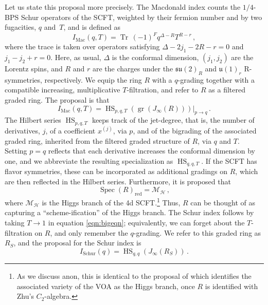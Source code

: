 \documentclass[12pt]{article}
\numberwithin{equation}{section}
\numberwithin{figure}{section}
\theoremstyle{plain}
\theoremstyle{definition}
\begin{document}
Let us state this proposal more precisely. The Macdonald index \cite{Gadde:2011uv} counts the $1/4$-BPS Schur operators of the SCFT, weighted by their fermion number and by two fugacities, $q$ and~$T$, and is defined as
\begin{equation}
    I_\text{Mac}(q, T) = \operatorname{Tr} \, (-1)^F q^{\Delta - R} T^{R - r} \,,
\end{equation}
where the trace is taken over operators satisfying $\Delta - 2j_1 - 2R - r = 0$ and $j_1 - j_2 + r = 0$. Here, as usual, $\Delta$ is the conformal dimension, $(j_1, j_2)$ are the Lorentz spins, and $R$ and $r$ are the charges under the $\mathfrak{su}(2)_R$ and $\mathfrak{u}(1)_r$ R-symmetries, respectively. We equip the ring $R$ with a $q$-grading together with a compatible increasing, multiplicative $T$-filtration, and refer to $R$ as a filtered graded ring. The proposal is that
\begin{equation}\label{eqn:bigeqn}
    I_\text{Mac}(q, T) = \operatorname{HS}_{p,q,T}(\operatorname{gr}(J_\infty(R))) \big|_{p \rightarrow q} \,.
\end{equation}
The Hilbert series $\operatorname{HS}_{p,q,T}$ keeps track of the jet-degree, that is, the number of derivatives, $j$, of a coefficient $x^{(j)}$, via $p$, and of the bigrading of the associated graded ring, inherited from the filtered graded structure of $R$, via $q$ and $T$. Setting $p = q$ reflects that each derivative increases the conformal dimension by one, and we abbreviate the resulting specialization as $\operatorname{HS}_{q,q,T}$. If the SCFT has flavor symmetries, these can be incorporated as additional gradings on $R$, which are then reflected in the Hilbert series. Furthermore, it is proposed that
\begin{equation}
    \operatorname{Spec}(R)_{\operatorname{red}} = \mathcal{M}_\mathcal{H} \,,
\end{equation}
where $\mathcal{M}_\mathcal{H}$ is the Higgs branch of the 4d SCFT.\footnote{As we discuss anon, this is identical to the proposal of \cite{Beem:2017ooy} which identifies the associated variety \cite{arakawa2015associated} of the VOA as the Higgs branch, once $R$ is identified with Zhu's $C_2$-algebra.} Thus, $R$ can be thought of as capturing a ``scheme-ification'' of the Higgs branch. The Schur index follows by taking $T \rightarrow 1$ in equation \eqref{eqn:bigeqn}; equivalently, we can forget about the $T$-filtration on $R$, and only remember the $q$-grading. We refer to this graded ring as $R_S$, and the proposal for the Schur index is
\begin{equation}\label{eqn:schureqn}
    I_\text{Schur}(q) = \operatorname{HS}_{q,q}(J_\infty(R_S)) \,.
\end{equation}
\end{document}
